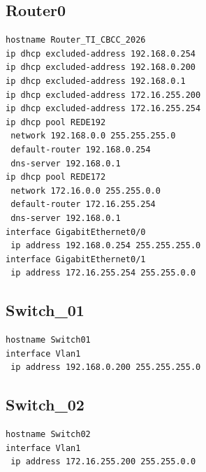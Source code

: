 \subsection*{Router0}
\begin{lstlisting}
hostname Router_TI_CBCC_2026
ip dhcp excluded-address 192.168.0.254
ip dhcp excluded-address 192.168.0.200
ip dhcp excluded-address 192.168.0.1
ip dhcp excluded-address 172.16.255.200
ip dhcp excluded-address 172.16.255.254
ip dhcp pool REDE192
 network 192.168.0.0 255.255.255.0
 default-router 192.168.0.254
 dns-server 192.168.0.1
ip dhcp pool REDE172
 network 172.16.0.0 255.255.0.0
 default-router 172.16.255.254
 dns-server 192.168.0.1
interface GigabitEthernet0/0
 ip address 192.168.0.254 255.255.255.0
interface GigabitEthernet0/1
 ip address 172.16.255.254 255.255.0.0
\end{lstlisting}
\subsection*{Switch\_01}
\begin{lstlisting}
hostname Switch01
interface Vlan1
 ip address 192.168.0.200 255.255.255.0
\end{lstlisting}
\subsection*{Switch\_02}
\begin{lstlisting}
hostname Switch02
interface Vlan1
 ip address 172.16.255.200 255.255.0.0
\end{lstlisting}